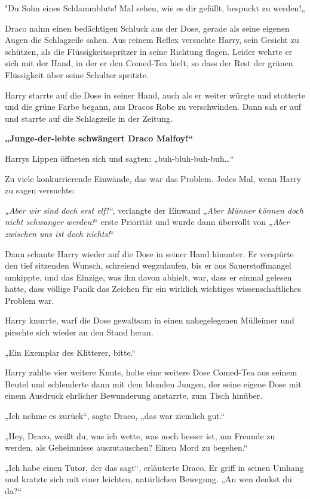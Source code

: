 {"Du Sohn eines Schlammbluts! Mal sehen, wie es dir gefällt, bespuckt zu werden!„

Draco nahm einen bedächtigen Schluck aus der Dose, gerade als seine eigenen Augen die Schlagzeile sahen. Aus reinem Reflex versuchte Harry, sein Gesicht zu schützen, als die Flüssigkeitsspritzer in seine Richtung flogen. Leider wehrte er sich mit der Hand, in der er den Comed-Tea hielt, so dass der Rest der grünen Flüssigkeit über seine Schulter spritzte.

Harry starrte auf die Dose in seiner Hand, auch als er weiter würgte und stotterte und die grüne Farbe begann, aus Dracos Robe zu verschwinden. Dann sah er auf und starrte auf die Schlagzeile in der Zeitung.

\textbf{„Junge-der-lebte schwängert Draco Malfoy!“}

Harrys Lippen öffneten sich und sagten: „buh-bluh-buh-buh…“

Zu viele konkurrierende Einwände, das war das Problem. Jedes Mal, wenn Harry zu sagen versuchte:

\emph{„Aber wir sind doch erst elf!“,} verlangte der Einwand „\emph{Aber Männer können doch nicht schwanger werden!}“ erste Priorität und wurde dann überrollt von „\emph{Aber zwischen uns ist doch nichts!}“

Dann schaute Harry wieder auf die Dose in seiner Hand hinunter. Er verspürte den tief sitzenden Wunsch, schreiend wegzulaufen, bis er aus Sauerstoffmangel umkippte, und das Einzige, was ihn davon abhielt, war, dass er einmal gelesen hatte, dass völlige Panik das Zeichen für ein wirklich wichtiges wissenschaftliches Problem war.

Harry knurrte, warf die Dose gewaltsam in einen nahegelegenen Mülleimer und pirschte sich wieder an den Stand heran.

„Ein Exemplar des Klitterer, bitte.“

Harry zahlte vier weitere Knuts, holte eine weitere Dose Comed-Tea aus seinem Beutel und schlenderte dann mit dem blonden Jungen, der seine eigene Dose mit einem Ausdruck ehrlicher Bewunderung anstarrte, zum Tisch hinüber.

„Ich nehme es zurück“, sagte Draco, „das war ziemlich gut.“

„Hey, Draco, weißt du, was ich wette, was noch besser ist, um Freunde zu werden, als Geheimnisse auszutauschen? Einen Mord zu begehen.“

„Ich habe einen Tutor, der das sagt“, erläuterte Draco. Er griff in seinen Umhang und kratzte sich mit einer leichten, natürlichen Bewegung. „An wen denkst du da?“

}
